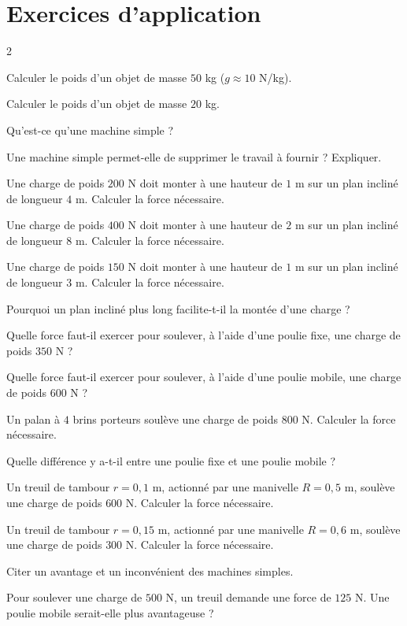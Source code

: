 \section{Exercices d'application}
\begin{multicols}{2}

\exo{} Calculer le poids d'un objet de masse $50$ kg ($g\approx10$ N/kg).

\exo{} Calculer le poids d'un objet de masse $20$ kg.

\exo{} Qu'est-ce qu'une machine simple ?

\exo{} Une machine simple permet-elle de supprimer le travail à fournir ?
Expliquer.

\exo{} Une charge de poids $200$ N doit monter à une hauteur de $1$ m sur un plan
incliné de longueur $4$ m. Calculer la force nécessaire.

\exo{} Une charge de poids $400$ N doit monter à une hauteur de $2$ m sur un plan
incliné de longueur $8$ m. Calculer la force nécessaire.

\exo{} Une charge de poids $150$ N doit monter à une hauteur de $1$ m sur un plan
incliné de longueur $3$ m. Calculer la force nécessaire.

\exo{} Pourquoi un plan incliné plus long facilite-t-il la montée d'une charge ?

\exo{} Quelle force faut-il exercer pour soulever, à l'aide d'une poulie fixe,
une charge de poids $350$ N ?

\exo{} Quelle force faut-il exercer pour soulever, à l'aide d'une poulie mobile,
une charge de poids $600$ N ?

\exo{} Un palan à $4$ brins porteurs soulève une charge de poids $800$ N.
Calculer la force nécessaire.

\exo{} Quelle différence y a-t-il entre une poulie fixe et une poulie mobile ?

\exo{} Un treuil de tambour $r=0{,}1$ m, actionné par une manivelle $R=0{,}5$ m,
soulève une charge de poids $600$ N. Calculer la force nécessaire.

\exo{} Un treuil de tambour $r=0{,}15$ m, actionné par une manivelle $R=0{,}6$ m,
soulève une charge de poids $300$ N. Calculer la force nécessaire.

\exo{} Citer un avantage et un inconvénient des machines simples.

\exo{} Pour soulever une charge de $500$ N, un treuil demande une force de $125$
N. Une poulie mobile serait-elle plus avantageuse ?

\end{multicols}

